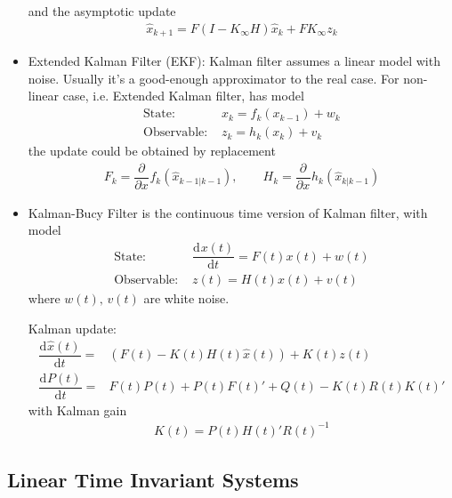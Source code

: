 \begin{itemize}[topsep=2pt,itemsep=0pt]
    and the asymptotic update
    \begin{align}
        \hat{x}_{k+1}=F\left(I-K_\infty H\right)\hat{x}_k+ FK_\infty z_k 
    \end{align}
    
    \item Extended Kalman Filter (EKF): Kalman filter assumes a linear model with noise. Usually it's a good-enough approximator to the real case. For non-linear case, i.e. Extended Kalman filter, has model
    \begin{align}
         \text{State: }&x_k=f_k(x_{k-1})+w_k\\
         \text{Observable: }&z_k=h_k(x_k)+v_k
    \end{align}
    the update could be obtained by replacement
    \begin{align}
         F_k=\dfrac{\partial^{}  }{\partial x ^{}}f_k\left(\hat{x}_{k-1|k-1}\right),\qquad H_k=\dfrac{\partial^{} }{\partial x^{}}h_k\left(\hat{x}_{k|k-1}\right)
    \end{align}
    \item Kalman-Bucy Filter is the continuous time version of Kalman filter, with model
    \begin{align}
        \text{State: }&\dfrac{\mathrm{d}^{} x(t)}{\mathrm{d}t^{}}=F(t)x(t)+w(t)\\
        \text{Observable: }&z(t)=H(t)x(t)+v(t)
    \end{align}
    where $ w(t),\,v(t) $ are white noise.

    Kalman update:
    \begin{align}
        \dfrac{\mathrm{d}^{} \hat{x}(t)}{\mathrm{d}t^{}}=&\left( F(t)-K(t)H(t)\hat{x}(t) \right)+K(t)z(t)\\
        \dfrac{\mathrm{d}^{}P(t) }{\mathrm{d}t}=&F(t)P(t)+P(t)F(t)'+Q(t)-K(t)R(t)K(t)'
    \end{align}
    with Kalman gain
    \begin{align}
        K(t)=P(t)H(t)'R(t)^{-1} 
    \end{align}
    
    
\end{itemize}

    

\subsection{Linear Time Invariant Systems}

